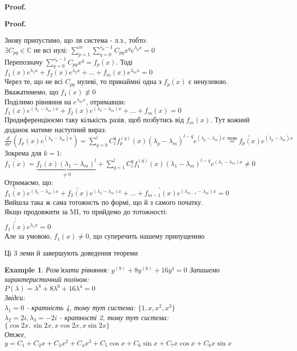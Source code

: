 \documentclass[a4paper, 10pt]{article}
\makeatletter
\def\qed{$\blacksquare$}
\theoremstyle{theoremdd}
\theoremstyle{theoremdd}
\theoremstyle{theoremdd}
\theoremstyle{theoremdd}
\newtheorem{example}[theorem]{Example}
\theoremstyle{theoremdd}
\theoremstyle{theoremdd}
\theoremstyle{theoremdd}
\theoremstyle{theoremdd}
\renewenvironment{proof}[1][Proof.\\]{\par
\pushQED{\hfill \qed}%
\normalfont \topsep6\p@\@plus6\p@\relax
\trivlist
\item\relax
{\bfseries
#1\@addpunct{.}}\hspace\labelsep\ignorespaces
}{%
\popQED\endtrivlist\@endpefalse
}
\makeatother
\begin{document}
\begin{proof}
\begin{proof}
Знову припустимо, що ля система - л.з., тобто:\\
$\exists C_{pq} \in \mathbb{C}$ не всі нулі: $\displaystyle \sum_{p=1}^m \sum_{q=0}^{s_p-1} C_{pq}x^qe^{\lambda_p x} = 0$\\
Перепозначу $\displaystyle \sum_{q=0}^{s_p - 1} C_{pq}x^q = f_p(x)$. Тоді\\
$f_1(x)e^{\lambda_1 x} + f_2(x)e^{\lambda_2 x} + \dots + f_m(x)e^{\lambda_m x} = 0$\\
Через те, що не всі $C_{pq}$ нулеві, то принаймні одна з $f_p(x)$ є ненулевою. Вважатимемо, що $f_1(x) \not\equiv 0$\\
Поділимо рівняння на $e^{\lambda_m x}$, отримавши:\\
$f_1(x)e^{(\lambda_1-\lambda_m) x} + f_2(x)e^{(\lambda_2-\lambda_m) x} + \dots + f_m(x) = 0$\\
Продиференціюємо таку кількість разів, щоб позбутись від $f_m(x)$.
Тут кожний доданок матиме наступний вираз:\\
$\displaystyle \frac{d^l}{dx^l} \left(f_p(x)e^{(\lambda_p - \lambda_m)x} \right) = \sum_{q=0}^l C_l^q f_p^{(q)}(x)(\lambda_p - \lambda_m)^{l-q}e^{(\lambda_p - \lambda_m)x} \overset{\textrm{позн}}{=} \tilde{f_p(x)}e^{(\lambda_p - \lambda_m)x}$\\
Зокрема для $k=1$:\\ $\displaystyle \tilde{f_1(x)} = \underbrace{f_1(x)(\lambda_1 - \lambda_m)^l}_{\neq 0} + \sum_{q=1}^l C_l^q f_1^{(q)}(x)(\lambda_1 - \lambda_m)^{l-q}e^{(\lambda_1 - \lambda_m)x} \neq 0$\\
Отримаємо, що:\\
$\tilde{f_1(x)}e^{(\lambda_1 - \lambda_m)x} + \tilde{f_2(x)}e^{(\lambda_2 - \lambda_m)x} + \dots + \tilde{f_{m-1}(x)}e^{(\lambda_{m-1} - \lambda_m)x} = 0$\\
Вийшла така ж сама тотожнсть по формі, що й з самого початку.\\
Якщо продовжити за MI, то прийдемо до тотожності:\\
$\overset{\vdots}{\tilde{f_1(x)}}e^{\lambda_1 x} = 0$\\
Але за умовою, $f_1(x) \neq 0$, що суперечить нашему припущенню 
\end{proof}

Ці 3 леми й завершують доведення теореми 
\end{proof}

\begin{example}
Розв'язати рівняння: $y^{(8)}+8y^{(6)}+16y^{4} = 0$
Запишемо характеристичний поліном:\\
$P(\lambda) = \lambda^8 + 8 \lambda^6 + 16 \lambda^4 = 0$\\
Звідси:\\
$\lambda_1 = 0$ - кратність 4, тому тут система: $\{1, x, x^2, x^3\}$\\
$\lambda_2 = 2i, \lambda_3 = -2i$ - кратності 2, тому тут система: $\{\cos 2x, \sin 2x, x \cos 2x, x \sin 2x \}$\\
Отже, $y = C_1 + C_2 x + C_3 x^2 + C_4 x^3 + C_5 \cos x + C_6 \sin x + C_7 x \cos x + C_8 x \sin x$
\end{example}
\end{document}
